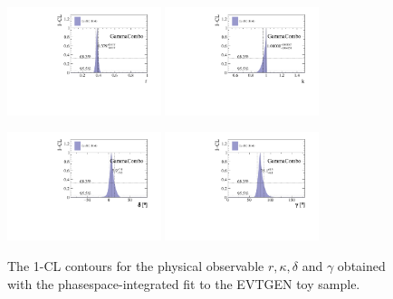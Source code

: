 \begin{figure}[h]
	\centering
		\includegraphics[width=0.4\textwidth, height = !]{figs/GammaCombo/signal_DsKpipi_CPV_MC/cartesian_cp_coeff_r.pdf} 
		\includegraphics[width=0.4\textwidth, height = !]{figs/GammaCombo/signal_DsKpipi_CPV_MC/cartesian_cp_coeff_k.pdf} 
		
		\includegraphics[width=0.4\textwidth, height = !]{figs/GammaCombo/signal_DsKpipi_CPV_MC/cartesian_cp_coeff_d.pdf} 
		\includegraphics[width=0.4\textwidth, height = !]{figs/GammaCombo/signal_DsKpipi_CPV_MC/cartesian_cp_coeff_g.pdf} 
		\caption{The 1-CL contours for the physical observable $r,\kappa,\delta$ and $\gamma$ obtained with the phasespace-integrated fit to the \textsf{EVTGEN} toy sample. }
		\label{fig:FitGenCL}	
\end{figure} 

